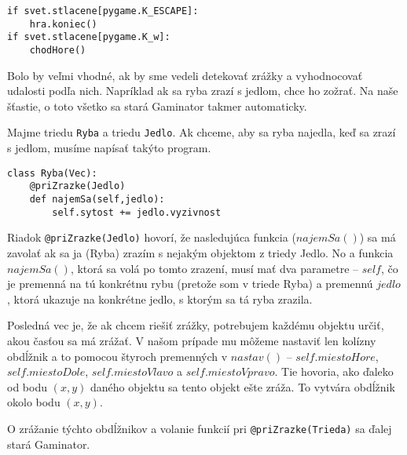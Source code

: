\begin{lstlisting}
if svet.stlacene[pygame.K_ESCAPE]:
    hra.koniec()
if svet.stlacene[pygame.K_w]:
    chodHore()
\end{lstlisting}


Bolo by veľmi vhodné, ak by sme vedeli detekovať zrážky a vyhodnocovať udalosti podľa nich.
Napríklad ak sa ryba zrazí s jedlom, chce ho zožrať. Na naše šťastie, o toto všetko sa stará
Gaminator takmer automaticky.

Majme triedu \texttt{Ryba} a triedu \texttt{Jedlo}. Ak chceme, aby sa ryba najedla, keď sa zrazí s
jedlom, musíme napísať takýto program.

\begin{lstlisting}
class Ryba(Vec):
    @priZrazke(Jedlo)
    def najemSa(self,jedlo):
        self.sytost += jedlo.vyzivnost
\end{lstlisting}

Riadok \texttt{@priZrazke(Jedlo)} hovorí, že nasledujúca funkcia ($najemSa()$) sa má zavolať ak sa
ja (Ryba) zrazím s nejakým objektom z triedy Jedlo. No a funkcia $najemSa()$, ktorá sa volá po tomto
zrazení, musí mať dva parametre -- $self$, čo je premenná na tú konkrétnu rybu (pretože som v triede
Ryba) a premennú $jedlo$, ktorá ukazuje na konkrétne jedlo, s ktorým sa tá ryba zrazila.

Posledná vec je, že ak chcem riešiť zrážky, potrebujem každému objektu určiť, akou časťou sa má
zrážať. V našom prípade mu môžeme nastaviť len kolízny obdĺžnik a to pomocou štyroch premenných v
$nastav()$ -- $self.miestoHore$, $self.miestoDole$, $self.miestoVlavo$ a $self.miestoVpravo$. Tie
hovoria, ako ďaleko od bodu $(x,y)$ daného objektu sa tento objekt ešte zráža. To vytvára obdĺžnik
okolo bodu $(x,y)$.

O zrážanie týchto obdĺžnikov a volanie funkcií pri \texttt{@priZrazke(Trieda)} sa ďalej stará
Gaminator.


